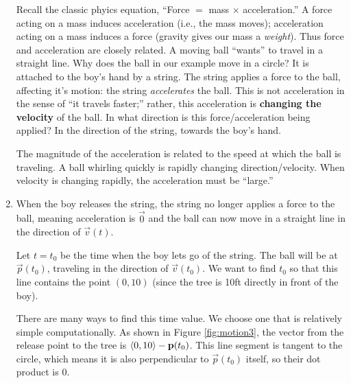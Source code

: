 \documentclass{ximera}
\begin{document}
\begin{example}
\begin{explanation}
\begin{enumerate}
    Recall the classic phyics equation, ``Force $=$ mass $\times$
    acceleration.'' A force acting on a mass induces acceleration
    (i.e., the mass moves); acceleration acting on a mass induces a
    force (gravity gives our mass a \emph{weight}). Thus force and
    acceleration are closely related. A moving ball ``wants'' to
    travel in a straight line. Why does the ball in our example move
    in a circle? It is attached to the boy's hand by a string. The
    string applies a force to the ball, affecting it's motion: the
    string \emph{accelerates} the ball. This is not acceleration in
    the sense of ``it travels faster;'' rather, this acceleration is
    \textbf{changing the velocity} of the ball. In what direction is
    this force/acceleration being applied? In the direction of the
    string, towards the boy's hand.
	
    The magnitude of the acceleration is related to the speed at which
    the ball is traveling. A ball whirling quickly is rapidly changing
    direction/velocity. When velocity is changing rapidly, the
    acceleration must be ``large.''
	
  \item When the boy releases the string, the string no longer applies
    a force to the ball, meaning acceleration is $\vec 0$ and the ball
    can now move in a straight line in the direction of $\vec v(t)$.
    \drawexampleline
	
    Let $t=t_0$ be the time when the boy lets go of the string. The
    ball will be at $\vec{p}(t_0)$, traveling in the direction of
    $\vec v(t_0)$. We want to find $t_0$ so that this line contains
    the point $(0,10)$ (since the tree is 10ft directly in front of
    the boy).  
	
    There are many ways to find this time value. We choose one that is
    relatively simple computationally. As shown in Figure
    \ref{fig:motion3}, the vector from the release point to the tree
    is $\left\langle 0,10\right\rangle - \mathbf{p}(t_0)$. This line segment is tangent to
    the circle, which means it is also perpendicular to $\vec{p}(t_0)$
    itself, so their dot product is 0.
    

\end{enumerate}
\end{explanation}
\end{example}
\end{document}
